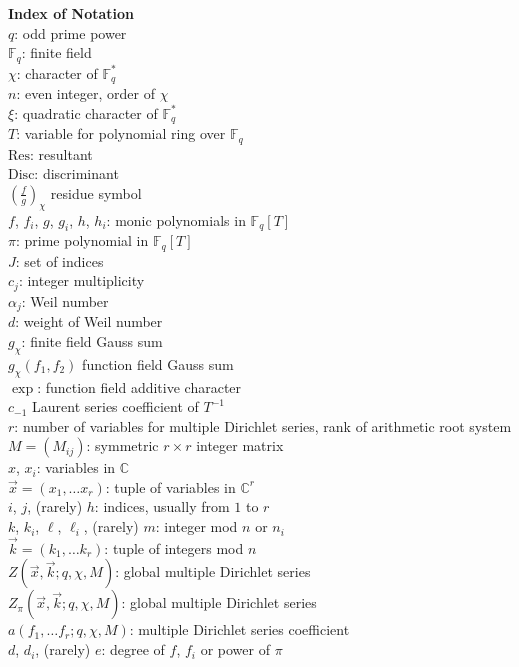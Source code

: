 \documentclass[11pt,letterpaper]{article}
\theoremstyle{definition}
\theoremstyle{remark}
\numberwithin{equation}{section}
\theoremstyle{dotless}
\newcommand{\C}{\mathbb{C}}
\newcommand{\F}{\mathbb{F}}
\newcommand{\res}[2]{\left(\frac{#1}{#2}\right)}
\begin{document}
\textbf{Index of Notation} \\
$q$: odd prime power \\
$\F_q$: finite field \\
$\chi$: character of $\F_q^*$ \\
$n$: even integer, order of $\chi$ \\
$\xi$: quadratic character of $\F_q^*$ \\
$T$: variable for polynomial ring over $\F_q$ \\
$\mathrm{Res}$: resultant \\
$\mathrm{Disc}$: discriminant \\
$\res{f}{g}_\chi$ residue symbol \\
$f$, $f_i$, $g$, $g_i$, $h$, $h_i$: monic polynomials in $\F_q[T]$\\
$\pi$: prime polynomial in $\F_q[T]$\\
$J$: set of indices \\
$c_j$: integer multiplicity \\
$\alpha_j$: Weil number \\
$d$: weight of Weil number \\
$g_\chi$: finite field Gauss sum \\
$g_\chi(f_1, f_2)$ function field Gauss sum \\
$\exp$: function field additive character \\
$c_{-1}$ Laurent series coefficient of $T^{-1}$ \\
$r$: number of variables for multiple Dirichlet series, rank of arithmetic root system \\
$M=(M_{ij})$: symmetric $r\times r$ integer matrix \\
$x$, $x_i$: variables in $\C$ \\
$\vec{x}=(x_1, \ldots x_r)$: tuple of variables in $\C^r$ \\
$i$, $j$, (rarely) $h$: indices, usually from $1$ to $r$\\
$k$, $k_i$, $\ell$, $\ell_i$, (rarely) $m$: integer mod $n$ or $n_i$ \\
$\vec{k}=(k_1, \ldots k_r)$: tuple of integers mod $n$ \\
$Z(\vec{x}, \vec{k}; q, \chi, M)$: global multiple Dirichlet series \\
$Z_\pi(\vec{x}, \vec{k}; q, \chi, M)$: global multiple Dirichlet series \\
$a(f_1, \ldots f_r; q, \chi, M)$: multiple Dirichlet series coefficient \\
$d$, $d_i$, (rarely) $e$: degree of $f$, $f_i$ or power of $\pi$ \\
\end{document}
